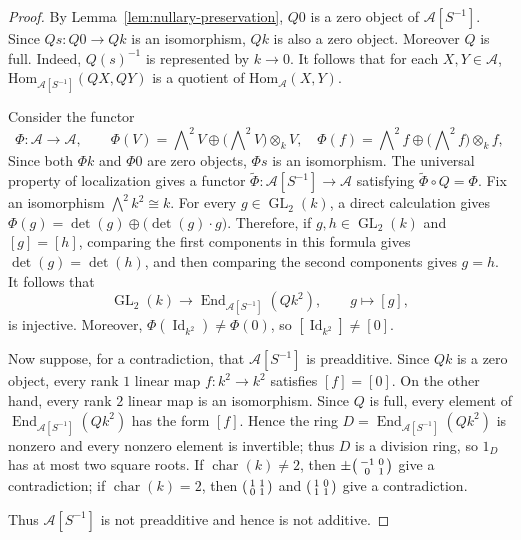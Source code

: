 \documentclass[10pt,a4paper]{amsart}
\theoremstyle{plain}
\theoremstyle{definition}
\theoremstyle{remark}
\begin{document}
\begin{proof}
  By Lemma~\ref{lem:nullary-preservation}, $Q0$ is a zero object of $\mathcal A[S^{-1}]$.
  Since $Qs:Q0\longrightarrow Qk$ is an isomorphism, $Qk$ is also a zero object.
  Moreover $Q$ is full.
  Indeed, $Q(s)^{-1}$ is represented by $k \longrightarrow 0$.
  It follows that for each $X,Y \in \mathcal{A}$, $\mathrm{Hom}_{\mathcal{A}[S^{-1}]}(QX,QY)$ is a quotient of $\mathrm{Hom}_{\mathcal{A}}(X,Y)$.

  \medskip

  Consider the functor
  \[
    \Phi:\mathcal A\longrightarrow\mathcal A, \qquad
    \Phi(V)=\bigwedge\nolimits^2V \oplus\bigl(\bigwedge\nolimits^2V\bigr)\otimes_kV,\quad
    \Phi(f)=\bigwedge\nolimits^2f \oplus\bigl(\bigwedge\nolimits^2f\bigr)\otimes_kf,
  \]
  Since both $\Phi k$ and $\Phi 0$ are zero objects, $\Phi s$ is an isomorphism.
  The universal property of localization gives a functor $\widetilde\Phi:\mathcal{A}[S^{-1}]\longrightarrow\mathcal A$ satisfying $\widetilde\Phi\circ Q=\Phi$.
  Fix an isomorphism $\bigwedge^2k^2\cong k$.
  For every $g\in\operatorname{GL}_2(k)$, a direct calculation gives $\Phi(g)=\det(g)\oplus\bigl(\det(g) \cdot g\bigr)$.
  Therefore, if $g,h\in\operatorname{GL}_2(k)$ and $[g]=[h]$, comparing the first components in this formula gives $\det(g)=\det(h)$, and then comparing the second components gives $g=h$.
  It follows that
  \[
    \operatorname{GL}_2(k)\longrightarrow
    \operatorname{End}_{\mathcal A [S^{-1}]}(Qk^2),
    \qquad g\longmapsto[g],
  \]
  is injective.
  Moreover, $\Phi(\operatorname{Id}_{k^2})\neq\Phi(0)$, so $[\operatorname{Id}_{k^2}]\neq[0]$.

  \medskip

  Now suppose, for a contradiction, that $\mathcal A [S^{-1}]$ is preadditive.
  Since $Qk$ is a zero object, every rank $1$ linear map $f:k^2\longrightarrow k^2$ satisfies $[f] = [0]$.
  On the other hand, every rank $2$ linear map is an isomorphism.
  Since $Q$ is full, every element of $\operatorname{End}_{\mathcal A [S^{-1}]}(Qk^2)$ has the form $[f]$.
  Hence the ring $D = \operatorname{End}_{\mathcal A [S^{-1}]}(Qk^2)$ is nonzero and every nonzero element is invertible; thus $D$ is a division ring, so $1_D$ has at most two square roots.
  If $\operatorname{char}(k)\neq2$, then $\pm \begin{psmallmatrix}-1&0\\0&1\end{psmallmatrix}$ give a contradiction; if $\operatorname{char}(k)=2$, then $\begin{psmallmatrix}1&1\\0&1\end{psmallmatrix}$ and $\begin{psmallmatrix}1&0\\1&1\end{psmallmatrix}$ give a contradiction.

  \medskip

  Thus $\mathcal A[S^{-1}]$ is not preadditive and hence is not additive.
\end{proof}
\end{document}
